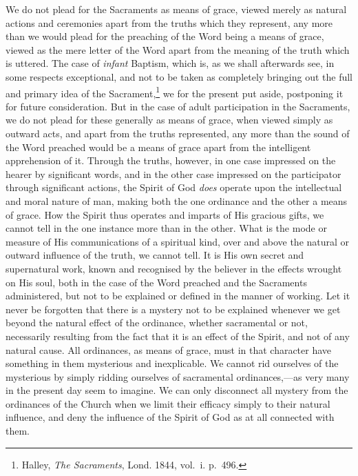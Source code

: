 \documentclass[]{book}
\begin{document}
We do not plead for the Sacraments as means of grace, viewed merely as natural actions and ceremonies apart from the truths which they represent, any more than we would plead for the preaching of the Word being a means of grace, viewed as the mere letter of the Word apart from the meaning of the truth which is uttered. The case of \emph{infant} Baptism, which is, as we shall afterwards see, in some respects exceptional, and not to be taken as completely bringing out the full and primary idea of the Sacrament,\footnote{Halley, \emph{The Sacraments}, Lond. 1844, vol.~i. p.~496.} we for the present put aside, postponing it for future consideration. But in the case of adult participation in the Sacraments, we do not plead for these generally as means of grace, when viewed simply as outward acts, and apart from the truths represented, any more than the sound of the Word preached would be a means of grace apart from the intelligent apprehension of it. Through the truths, however, in one case impressed on the hearer by significant words, and in the other case impressed on the participator through significant actions, the Spirit of God \emph{does} operate upon the intellectual and moral nature of man, making both the one ordinance and the other a means of grace. How the Spirit thus operates and imparts of His gracious gifts, we cannot tell in the one instance more than in the other. What is the mode or measure of His communications of a spiritual kind, over and above the natural or outward influence of the truth, we cannot tell. It is His own secret and supernatural work, known and recognised by the believer in the effects wrought on His soul, both in the case of the Word preached and the Sacraments administered, but not to be explained or defined in the manner of working. Let it never be forgotten that there is a mystery not to be explained whenever we get beyond the natural effect of the ordinance, whether sacramental or not, necessarily resulting from the fact that it is an effect of the Spirit, and not of any natural cause. All ordinances, as means of grace, must in that character have something in them mysterious and inexplicable. We cannot rid ourselves of the mysterious by simply ridding ourselves of sacramental ordinances,---as very many in the present day seem to imagine. We can only disconnect all mystery from the ordinances of the Church when we limit their efficacy simply to their natural influence, and deny the influence of the Spirit of God as at all connected with them.
\end{document}

